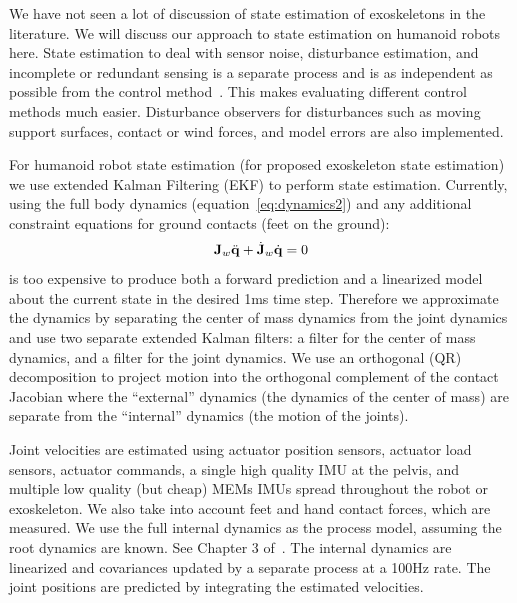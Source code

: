 \documentclass[letterpaper,12pt,fullpage]{article}
\begin{document}
We have not seen a lot of discussion of state estimation of exoskeletons in
the literature.
We will discuss our approach to state estimation on humanoid robots here.
State estimation to deal with sensor noise,
disturbance estimation, and incomplete or
redundant sensing is a separate process and is as independent as possible
from the control method~\cite{certainty-eq,separation-prin}.
This makes evaluating different control methods much easier.
Disturbance observers for disturbances such as
moving support surfaces, contact or wind forces, and model errors
are also implemented.

For humanoid robot state estimation (for proposed exoskeleton state estimation)
we use extended Kalman Filtering (EKF) to perform state estimation.
Currently, using the full body dynamics (equation~\ref{eq:dynamics2})
and any additional constraint equations for ground contacts (feet on the ground):
\begin{equation}
{\bf J}_w \ddot{{\bf q}} + \dot{{\bf J}}_w \dot{{\bf q}} = 0
\end{equation}
is too expensive to produce both a forward prediction and a linearized model
about the current state in the desired 1ms time step.
Therefore we approximate the dynamics by separating the center of mass dynamics
from the joint dynamics and use two separate extended Kalman filters:
a filter for the center of mass dynamics, and a filter for the joint dynamics.
We use an orthogonal (QR) decomposition to project motion into the orthogonal
complement of the contact Jacobian where the ``external'' dynamics (the dynamics
of the center of mass) are separate from the ``internal'' dynamics (the motion
of the joints).

Joint velocities are estimated using actuator position sensors, actuator load
sensors, actuator commands, a single high
quality IMU at the pelvis, and multiple low quality (but cheap) MEMs IMUs
spread throughout the robot or exoskeleton. We also take into account feet and hand
contact forces, which
are measured. We use the full internal dynamics as the process model,
assuming the root dynamics are known. See Chapter 3 of~\cite{Xinjelefu-thesis}.
The internal dynamics are linearized and covariances updated
by a separate process at a 100Hz rate.
The joint positions are predicted by integrating the estimated velocities.
\end{document}
